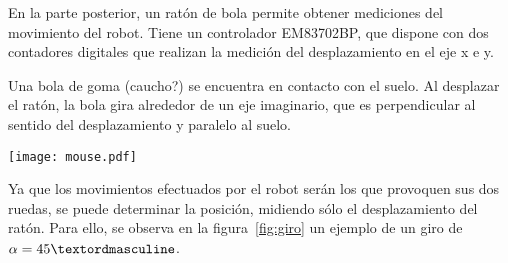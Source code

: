 \documentclass[10pt,a4paper,hidelinks]{article}
\begin{document}
\begin{multicols}{2}
En la parte posterior, un ratón de bola permite obtener mediciones del movimiento del
robot. Tiene un controlador EM83702BP, que dispone con dos contadores digitales que
realizan la medición del desplazamiento en el eje x e y.

Una bola de goma (caucho?) se encuentra en contacto con el suelo. Al desplazar el ratón, 
la bola gira alrededor de un eje imaginario, que es perpendicular al sentido del
desplazamiento y paralelo al suelo.

\begin{center}
\centering
\texttt{[image: mouse.pdf]}
\end{center}

Ya que los movimientos efectuados por el robot serán los que provoquen sus dos ruedas,
se puede determinar la posición, midiendo sólo el desplazamiento del ratón. Para ello,
se observa en la figura~\ref{fig:giro} un ejemplo de un giro de $\alpha = \RobotAngleº$.

\begin{center}
\end{center}
\end{multicols}
\end{document}
